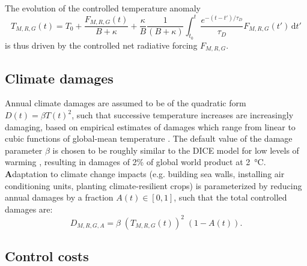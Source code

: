 \documentclass{article}
\begin{document}
The evolution of the controlled temperature anomaly
\begin{equation}
    T_{M,R,G}(t) = T_{0} + \frac{F_{M,R,G}(t)}{B + \kappa} + \frac{\kappa}{B} \frac{1}{(B+\kappa)} \int_{t_{0}}^{t} \frac{ e^{-(t-t')/\tau_{D}}}{\tau_{D}} F_{M,R,G}(t') \, \text{d}t'\label{eq.temperature}
\end{equation}
is thus driven by the controlled net radiative forcing $F_{M,R,G}$.

\subsection{Climate damages}

Annual climate damages are assumed to be of the quadratic form $D(t) = \beta T(t)^{2}$, such that successive temperature increases are increasingly damaging, based on empirical estimates of damages which range from linear to cubic functions of global-mean temperature \citep{stern_economics_2007}. The default value of the damage parameter $\beta$ is chosen to be roughly similar to the DICE model for low levels of warming \citep{nordhaus2013dice}, resulting in damages of 2\% of global world product at \SI{2}{\celsius}. \textbf{A}daptation to climate change impacts (e.g. building sea walls, installing air conditioning units, planting climate-resilient crops) is parameterized by reducing annual damages by a fraction $A(t) \in [0,1]$, such that the total controlled damages are:
\begin{equation}
    D_{M, R, G, A} = \beta \; (T_{M, R, G}(t))^{2} \; (1-A(t)).
\end{equation}

\subsection{Control costs}
\end{document}
